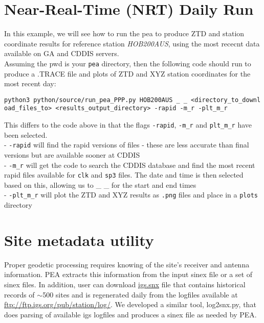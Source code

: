 \section{Near-Real-Time (NRT) Daily
Run}\label{near-real-time-nrt-daily-run}

In this example, we will see how to run the pea to produce ZTD and
station coordinate results for reference station \emph{HOB200AUS}, using
the most rececnt data available on GA and CDDIS servers.\\
Assuming the pwd is your \texttt{pea} directory, then the following code
should run to produce a .TRACE file and plots of ZTD and XYZ station
coordinates for the most recent day:

\texttt{python3\ python/source/run\_pea\_PPP.py\ HOB200AUS\ \_\ \_\ \textless{}directory\_to\_download\_files\_to\textgreater{}\ \textless{}results\_output\_directory\textgreater{}\ -rapid\ -m\_r\ -plt\_m\_r}

This differs to the code above in that the flags \texttt{-rapid},
\texttt{-m\_r} and \texttt{plt\_m\_r} have been selected.\\
- \texttt{-rapid} will find the rapid versions of files - these are less
accurate than final versions but are available sooner at CDDIS\\
- \texttt{-m\_r} will get the code to search the CDDIS database and find
the most recent rapid files available for \texttt{clk} and \texttt{sp3}
files. The date and time is then selected based on this, allowing us to
\_ \_ for the start and end times\\
- \texttt{-plt\_m\_r} will plot the ZTD and XYZ results as \texttt{.png}
files and place in a \texttt{plots} directory


\section{Site metadata utility}\label{log2snx}

Proper geodetic processing requires knowing of the site's receiver and antenna information. PEA extracts this information from the input sinex file or a set of sinex files. In addition, user can download \href{ftp://igs.ensg.ign.fr/pub/igs/igscb/station/general/igs.snx}{igs.snx} file that contains historical records of $\sim$500 sites and is regenerated daily from the logfiles available at \url{ftp://ftp.igs.org/pub/station/log/}. We developed a similar tool, log2snx.py, that does parsing of available igs logfiles and produces a sinex file as needed by PEA.

